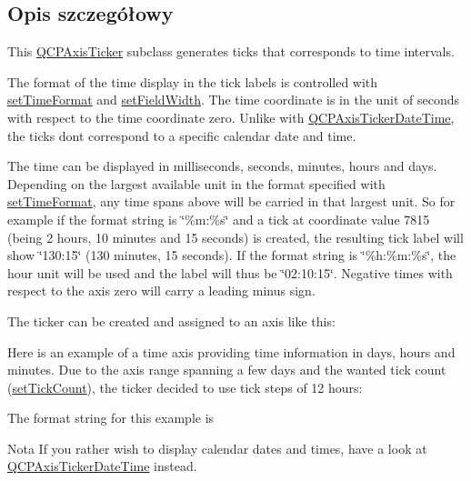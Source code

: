\subsection{Opis szczegółowy}


This \hyperlink{class_q_c_p_axis_ticker}{Q\+C\+P\+Axis\+Ticker} subclass generates ticks that corresponds to time intervals.

The format of the time display in the tick labels is controlled with \hyperlink{class_q_c_p_axis_ticker_time_a2f30b6e5125bce4256be9ce3177088ea}{set\+Time\+Format} and \hyperlink{class_q_c_p_axis_ticker_time_adc13e54fc969be98a5c0e3fa0dbaa293}{set\+Field\+Width}. The time coordinate is in the unit of seconds with respect to the time coordinate zero. Unlike with \hyperlink{class_q_c_p_axis_ticker_date_time}{Q\+C\+P\+Axis\+Ticker\+Date\+Time}, the ticks don\textquotesingle{}t correspond to a specific calendar date and time.

The time can be displayed in milliseconds, seconds, minutes, hours and days. Depending on the largest available unit in the format specified with \hyperlink{class_q_c_p_axis_ticker_time_a2f30b6e5125bce4256be9ce3177088ea}{set\+Time\+Format}, any time spans above will be carried in that largest unit. So for example if the format string is \char`\"{}\%m\+:\%s\char`\"{} and a tick at coordinate value 7815 (being 2 hours, 10 minutes and 15 seconds) is created, the resulting tick label will show \char`\"{}130\+:15\char`\"{} (130 minutes, 15 seconds). If the format string is \char`\"{}\%h\+:\%m\+:\%s\char`\"{}, the hour unit will be used and the label will thus be \char`\"{}02\+:10\+:15\char`\"{}. Negative times with respect to the axis zero will carry a leading minus sign.

The ticker can be created and assigned to an axis like this\+: 
\begin{DoxyCodeInclude}
\end{DoxyCodeInclude}
 Here is an example of a time axis providing time information in days, hours and minutes. Due to the axis range spanning a few days and the wanted tick count (\hyperlink{class_q_c_p_axis_ticker_a47752abba8293e6dc18491501ae34008}{set\+Tick\+Count}), the ticker decided to use tick steps of 12 hours\+:



The format string for this example is 
\begin{DoxyCodeInclude}
\end{DoxyCodeInclude}
 \begin{DoxyNote}{Nota}
If you rather wish to display calendar dates and times, have a look at \hyperlink{class_q_c_p_axis_ticker_date_time}{Q\+C\+P\+Axis\+Ticker\+Date\+Time} instead. 
\end{DoxyNote}


